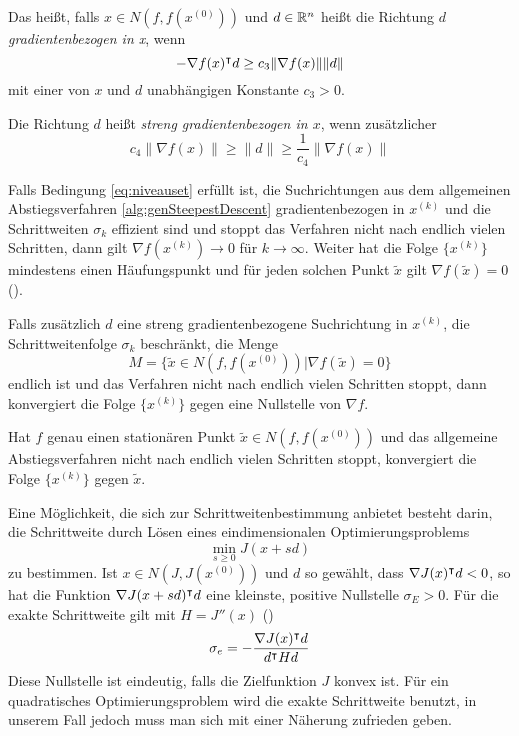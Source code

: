 Das heißt, falls $x\in N(f,f(x^{(0)}))$ und $d\in \mathbb{R}^n$ heißt die Richtung $d$ \textit{gradientenbezogen in x}, wenn
 \[
  -\nabla f(x)^\intercal d\geq c_3\|\nabla f(x)\| \|d\|
 \]
mit einer von $x$ und $d$ unabhängigen Konstante $c_3>0$.

Die Richtung $d$ heißt \textit{streng gradientenbezogen in $x$}, wenn zusätzlicher 
\[
 c_4\|\nabla f(x)\| \geq \|d\| \geq \frac{1}{c_4}\|\nabla f(x)\| 
\]


 Falls Bedingung \eqref{eq:niveauset} erfüllt ist, die Suchrichtungen aus dem allgemeinen Abstiegsverfahren \ref{alg:genSteepestDescent} gradientenbezogen in $x^{(k)}$ und die Schrittweiten $\sigma_k$ effizient sind und stoppt das Verfahren nicht nach endlich vielen Schritten, dann gilt $\nabla f(x^{(k)})\to 0$ für $k\to \infty$. Weiter hat die Folge $\{x^{(k)}\}$ mindestens einen Häufungspunkt und für jeden solchen Punkt $\tilde x$ gilt $\nabla f(\tilde x) = 0$ (\cite[Satz 4.4.9]{alt2002nichtlineare}).

Falls zusätzlich $d$ eine streng gradientenbezogene Suchrichtung in $x^{(k)}$, die Schrittweitenfolge $\sigma_k$ beschränkt, die Menge 
$$M = \{\tilde x\in N(f,f(x^{(0)}))|\nabla f(\tilde x)=0\}$$ endlich ist und das Verfahren nicht nach endlich vielen Schritten stoppt, dann konvergiert die Folge $\{x^{(k)}\}$ gegen eine Nullstelle von $\nabla f$.

Hat $f$ genau einen stationären Punkt $\tilde x \in N(f,f(x^{(0)}))$ und das allgemeine Abstiegsverfahren nicht nach endlich vielen Schritten stoppt, konvergiert die Folge $\{x^{(k)}\}$ gegen $\tilde x$.
 
Eine Möglichkeit, die sich zur Schrittweitenbestimmung anbietet besteht darin, die Schrittweite durch Lösen eines eindimensionalen Optimierungsproblems
\[
 \min_{s\geq 0} J(x+sd)
\]
zu bestimmen. Ist $x\in N(J,J(x^{(0)}))$ und $d$ so gewählt, dass $\nabla J(x)^\intercal d <0$, so hat die Funktion $\nabla J(x+sd)^\intercal d$ eine kleinste, positive Nullstelle $\sigma_E>0$. Für die exakte Schrittweite gilt mit $H = J''(x)$ (\cite[Gleichung (4.5.5)]{alt2002nichtlineare})
\[
 \sigma_e = -\frac{\nabla J(x)^\intercal d}{d^\intercal H d}
\]
Diese Nullstelle ist eindeutig, falls die Zielfunktion $J$ konvex ist. Für ein quadratisches Optimierungsproblem wird die exakte Schrittweite benutzt, in unserem Fall jedoch muss man sich mit einer Näherung zufrieden geben. 
 
